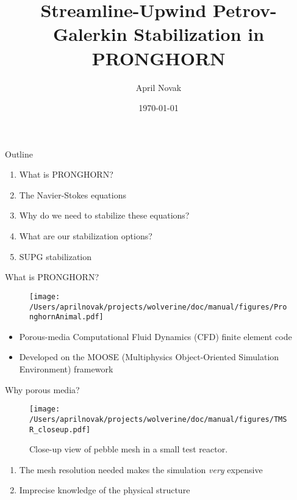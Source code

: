 \documentclass{beamer}
\title[PRONGHORN]{Streamline-Upwind Petrov-Galerkin Stabilization in PRONGHORN}
\author{April Novak}
\institute{UC Berkeley}
\date{\today}
\begin{document}
\begin{frame}
  \titlepage
\end{frame}

\begin{frame}{Outline}
\begin{enumerate}
\item What is PRONGHORN?
\item The Navier-Stokes equations
\item Why do we need to stabilize these equations?
\item What are our stabilization options?
\item SUPG stabilization
\end{enumerate}
\end{frame}

\begin{frame}{What is PRONGHORN?}

\begin{figure}[H]
\centering
\texttt{[image: /Users/aprilnovak/projects/wolverine/doc/manual/figures/PronghornAnimal.pdf]}
\end{figure}

\begin{itemize}
  \item Porous-media Computational Fluid Dynamics (CFD) finite element code
  \item Developed on the MOOSE (Multiphysics Object-Oriented Simulation Environment) framework
\end{itemize}

\end{frame}


\begin{frame}{Why porous media?}

\begin{figure}[H]
\centering
\texttt{[image: /Users/aprilnovak/projects/wolverine/doc/manual/figures/TMSR\_closeup.pdf]}
\caption{Close-up view of pebble mesh in a small test reactor.}
\label{fig:TMSRmesh}
\end{figure}

\begin{enumerate}
\item The mesh resolution needed makes the simulation \textit{very} expensive
\item Imprecise knowledge of the physical structure
\end{enumerate}

\end{frame}
\end{document}
